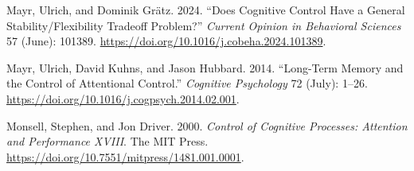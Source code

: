 \documentclass[
  11pt,
]{article}
\newlength{\cslhangindent}
\newenvironment{CSLReferences}[2] %
 {\begin{list}{}{%
  \setlength{\itemindent}{0pt}
  \setlength{\leftmargin}{0pt}
  \setlength{\parsep}{0pt}
  \ifodd #1
   \setlength{\leftmargin}{\cslhangindent}
   \setlength{\itemindent}{-1\cslhangindent}
  \fi
  \setlength{\itemsep}{#2\baselineskip}}}
 {\end{list}}
\begin{document}
\label{refs}
\begin{CSLReferences}{1}{0}
Mayr, Ulrich, and Dominik Grätz. 2024. {``Does Cognitive Control Have a
General Stability/Flexibility Tradeoff Problem?''} \emph{Current Opinion
in Behavioral Sciences} 57 (June): 101389.
\url{https://doi.org/10.1016/j.cobeha.2024.101389}.

Mayr, Ulrich, David Kuhns, and Jason Hubbard. 2014. {``Long-Term Memory
and the Control of Attentional Control.''} \emph{Cognitive Psychology}
72 (July): 1--26. \url{https://doi.org/10.1016/j.cogpsych.2014.02.001}.

Monsell, Stephen, and Jon Driver. 2000. \emph{Control of {Cognitive}
{Processes}: {Attention} and {Performance} {XVIII}}. The MIT Press.
\url{https://doi.org/10.7551/mitpress/1481.001.0001}.

\end{CSLReferences}
\end{document}
